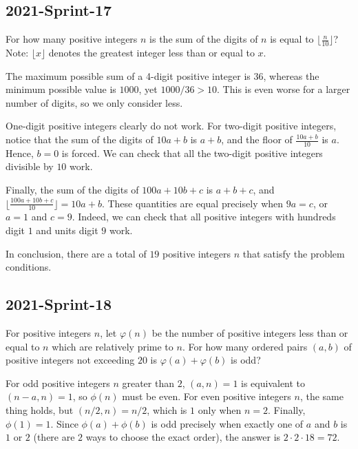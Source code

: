 \documentclass[12pt]{article}
\begin{document}
\subsection*{2021-Sprint-17}
For how many positive integers $n$ is the sum of the digits of $n$ is equal to $\lfloor \tfrac{n}{10} \rfloor$? Note: $\lfloor x\rfloor$ denotes the greatest integer less than or equal to $x$.
\begin{answer}
The maximum possible sum of a 4-digit positive integer is $36$, whereas the minimum possible value is $1000$, yet $1000/36 > 10$. This is even worse for a larger number of digits, so we only consider less.

One-digit positive integers clearly do not work. For two-digit positive integers, notice that the sum of the digits of $10a+b$ is $a+b$, and the floor of $\frac{10a+b}{10}$ is $a$. Hence, $b = 0$ is forced. We can check that all the two-digit positive integers divisible by $10$ work.

Finally, the sum of the digits of $100a+10b+c$ is $a+b+c$, and $\lfloor \frac{100a+10b+c}{10} \rfloor = 10a+b$. These quantities are equal precisely when $9a = c$, or $a=1$ and $c=9$. Indeed, we can check that all positive integers with hundreds digit $1$ and units digit $9$ work.

In conclusion, there are a total of $\boxed{19}$ positive integers $n$ that satisfy the problem conditions.
\end{answer}

\subsection*{2021-Sprint-18}
For positive integers $n$, let $\varphi(n)$ be the number of positive integers less than or equal to $n$ which are relatively prime to $n$. For how many ordered pairs $(a, b)$ of positive integers not exceeding $20$ is $\varphi(a)+\varphi(b)$ is odd?
\begin{answer}
For odd positive integers $n$ greater than $2$, $(a, n) = 1$ is equivalent to $(n-a, n) = 1$, so $\phi(n)$ must be even.
For even positive integers $n$, the same thing holds, but $(n/2, n) = n/2$, which is $1$ only when $n = 2$.
Finally, $\phi(1)=1$. Since $\phi(a)+\phi(b)$ is odd precisely when exactly one of $a$ and $b$ is $1$ or $2$ (there are $2$ ways to choose the exact order), the answer is $2\cdot 2\cdot 18 = \boxed{72}$.
\end{answer}
\end{document}
